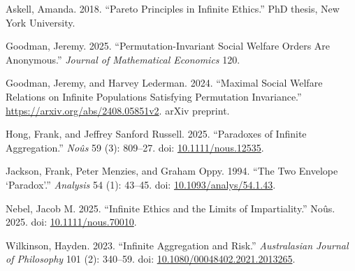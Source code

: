 \documentclass[
  letterpaper,
  DIV=11,
  numbers=noendperiod]{scrartcl}
\newlength{\cslhangindent}
\newenvironment{CSLReferences}[2] %
 {\begin{list}{}{%
  \setlength{\itemindent}{0pt}
  \setlength{\leftmargin}{0pt}
  \setlength{\parsep}{0pt}
  \ifodd #1
   \setlength{\leftmargin}{\cslhangindent}
   \setlength{\itemindent}{-1\cslhangindent}
  \fi
  \setlength{\itemsep}{#2\baselineskip}}}
 {\end{list}}
\begin{document}
\protect{}\label{refs}
\begin{CSLReferences}{1}{0}
Askell, Amanda. 2018. {``Pareto Principles in Infinite Ethics.''} PhD
thesis, New York University.

Goodman, Jeremy. 2025. {``Permutation-Invariant Social Welfare Orders
Are Anonymous.''} \emph{Journal of Mathematical Economics} 120.

Goodman, Jeremy, and Harvey Lederman. 2024. {``Maximal Social Welfare
Relations on Infinite Populations Satisfying Permutation Invariance.''}
\url{https://arxiv.org/abs/2408.05851v2}. arXiv preprint.

Hong, Frank, and Jeffrey Sanford Russell. 2025. {``Paradoxes of Infinite
Aggregation.''} \emph{Noûs} 59 (3): 809--27. doi:
\href{https://doi.org/10.1111/nous.12535}{10.1111/nous.12535}.

Jackson, Frank, Peter Menzies, and Graham Oppy. 1994. {``The Two
Envelope {`Paradox'}.''} \emph{Analysis} 54 (1): 43--45. doi:
\href{https://doi.org/10.1093/analys/54.1.43}{10.1093/analys/54.1.43}.

Nebel, Jacob M. 2025. {``Infinite Ethics and the Limits of
Impartiality.''} No{û}s. 2025. doi:
\href{https://doi.org/10.1111/nous.70010}{10.1111/nous.70010}.

Wilkinson, Hayden. 2023. {``Infinite Aggregation and Risk.''}
\emph{Australasian Journal of Philosophy} 101 (2): 340--59. doi:
\href{https://doi.org/10.1080/00048402.2021.2013265}{10.1080/00048402.2021.2013265}.

\end{CSLReferences}
\end{document}
